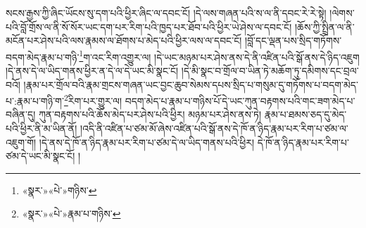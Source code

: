 སངས་རྒྱས་ཀྱི་ཞིང་ཡོངས་སུ་དག་པའི་ཕྱིར་ཞིང་ལ་དབང་ངོ། །དེ་ལས་གཞན་པའི་ས་ལ་ནི་དབང་རེ་རེ་སྟེ། །ལེགས་པའི་བློ་གྲོས་ལ་ནི་སོ་སོར་ཡང་དག་པར་རིག་པའི་ཁྱད་པར་ཐོབ་པའི་ཕྱིར་ཡེ་ཤེས་ལ་དབང་ངོ། །ཆོས་ཀྱི་སྤྲིན་ལ་ནི་མངོན་པར་ཤེས་པའི་ལས་རྣམས་ལ་ཐོགས་པ་མེད་པའི་ཕྱིར་ལས་ལ་དབང་ངོ། །བློ་དང་ལྡན་པས་སྲིད་གཏོགས་བདག་མེད་རྣམ་པ་གཉི་\footnote{«སྣར་»«པེ་»གཉིས་}ག་འང་རིག་འགྱུར་ལ། །དེ་ཡང་མཉམ་པར་ཤེས་ནས་དེ་ནི་འཛིན་པའི་སྒོ་ནས་དེ་ཉིད་འཇུག །དེ་ནས་དེ་ལ་ཡིད་གནས་ཕྱིར་ན་དེ་ལ་དེ་ཡང་མི་སྣང་ངོ། །དེ་མི་སྣང་བ་གྲོལ་བ་ཡིན་ཏེ་མཆོག་ཏུ་དམིགས་དང་བྲལ་བའོ། །རྣམ་པར་གྲོལ་བའི་རྣམ་གྲངས་གཞན་ཡང་བྱང་ཆུབ་སེམས་དཔས་སྲིད་པ་གསུམ་དུ་གཏོགས་པ་བདག་མེད་པ་:རྣམ་པ་གཉི་ག་\footnote{«སྣར་»«པེ་»རྣམ་པ་གཉིས་}རིག་པར་གྱུར་ལ། བདག་མེད་པ་རྣམ་པ་གཉིས་པོ་དེ་ཡང་ཀུན་བརྟགས་པའི་གང་ཟག་མེད་པ་བཞིན་དུ། ཀུན་བརྟགས་པའི་ཆོས་མེད་པར་ཤེས་པའི་ཕྱིར། མཉམ་པར་ཤེས་ནས་ཏེ། རྣམ་པ་ཐམས་ཅད་དུ་མེད་པའི་ཕྱིར་ནི་མ་ཡིན་ནོ། །འདི་ནི་འཛིན་པ་ཙམ་མོ་ཞེས་འཛིན་པའི་སྒོ་ནས་དེ་ཁོ་ན་ཉིད་རྣམ་པར་རིག་པ་ཙམ་ལ་འཇུག་གོ། །དེ་ནས་དེ་ཁོ་ན་ཉིད་རྣམ་པར་རིག་པ་ཙམ་དེ་ལ་ཡིད་གནས་པའི་ཕྱིར། དེ་ཁོ་ན་ཉིད་རྣམ་པར་རིག་པ་ཙམ་དེ་ཡང་མི་སྣང་ངོ། །

